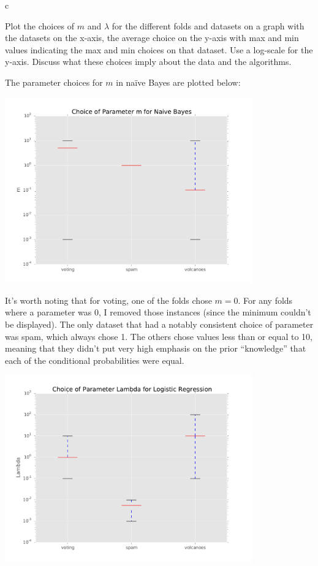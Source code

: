 \documentclass[fleqn]{homework}
\begin{document}
  \begin{problem}{c}
    \begin{question}
      Plot the choices of $m$ and $\lambda$ for the different folds and datasets
      on a graph with the datasets on the x-axis, the average choice on the
      y-axis with max and min values indicating the max and min choices on that
      dataset.  Use a log-scale for the y-axis.  Discuss what these choices
      imply about the data and the algorithms.
    \end{question}

    The parameter choices for $m$ in na\"ive Bayes are plotted below:

    \includegraphics[width=0.8\textwidth]{nbayes_m.pdf}

    It's worth noting that for voting, one of the folds chose $m=0$.  For any
    folds where a parameter was 0, I removed those instances (since the minimum
    couldn't be displayed).  The only dataset that had a notably consistent
    choice of parameter was spam, which always chose 1.  The others chose values
    less than or equal to 10, meaning that they didn't put very high emphasis on
    the prior ``knowledge'' that each of the conditional probabilities were
    equal.

    \includegraphics[width=0.8\textwidth]{logreg_lambda.pdf}


\end{problem}
\end{document}
